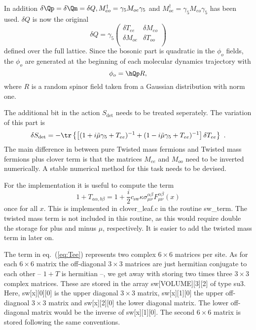 In addition $\delta\Qp = \delta\Qm = \delta Q, M_{eo}^\dagger =
\gamma_5 M_{oe}\gamma_5$ and $M_{oe}^\dagger = \gamma_5
M_{eo}\gamma_5$ has been used.  $\delta Q$
is now the original
\[
\delta Q = \gamma_5
\begin{pmatrix}
  \delta T_{ee} & \delta M_{eo} \\
  \delta M_{oe} & \delta T_{oo} \\
\end{pmatrix}
\]
defined over the full lattice. Since the bosonic part
is quadratic in the $\phi_o$ fields, the $\phi_o$ are generated at the
beginning of each molecular dynamics trajectory with
\begin{equation}
  \label{eq:eosw10}
  \phi_o = \hQp R,
\end{equation}
where $R$ is a random spinor field taken from a Gaussian distribution
with norm one.

The additional bit in the action $S_{\det}$ needs to be treated
seperately. The variation of this part is
\begin{equation}
  \label{eq:eosw11}
  \delta S_{\det} = -\tr \left\{ \left[(1+i\tilde\mu\gamma_5 + T_{ee})^{-1}  +
    (1-i\tilde\mu\gamma_5 + T_{ee})^{-1}\right] \delta T_{ee} \right\} \ . 
\end{equation}
The main difference in between pure Twisted mass fermions and Twisted
mass fermions plus clover term is that the matrices $M_{ee}$ and
$M_{oo}$ need to be inverted numerically. A stable numerical method
for this task needs to be devised.

For the implementation it is useful to compute the term
\begin{equation}
  \label{eq:Tee}
  1+T_{a\alpha,b\beta} = 1 + \frac{i}{2} c_\mathrm{sw}
  \kappa\sigma_{\mu\nu}^{\alpha\beta}F_{\mu\nu}^{\alpha\beta}(x)
\end{equation}  
once for all $x$. This is implemented in {\ttfamily clover\_leaf.c} in
the routine {\ttfamily sw\_term}. The twisted mass term is not
included in this routine, as this would require double the storage for
plus and minus $\mu$, respectively. It is easier to add the twisted
mass term in later on. 

The term in eq.~(\ref{eq:Tee}) represents two complex $6\times6$ matrices
per site. As for each $6\times6$ matrix the off-diagonal $3\times3$
matrices are just hermitian conjugate to each other -- $1+T$ is
hermitian --, we get away with storing two times three 
$3\times3$ complex matrices. These are stored in the array {\ttfamily
  sw[VOLUME][3][2]} of type {\ttfamily su3}. Here, {\ttfamily
  sw[x][0][0]} is the upper diagonal $3\times3$ matrix, {\ttfamily
  sw[x][1][0]} the upper off-diagnoal $3\times3$ matrix and {\ttfamily
  sw[x][2][0]} the lower diagonal matrix. The lower off-diagonal
matrix would be the inverse of {\ttfamily sw[x][1][0]}. The second
$6\times6$ matrix is stored following the same conventions.

